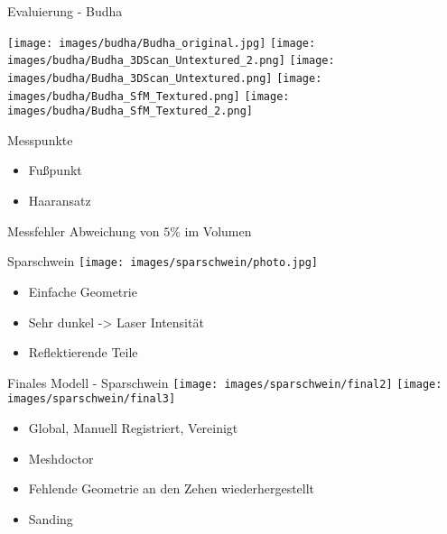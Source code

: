 \documentclass[11pt]{beamer}
\begin{document}
\begin{frame}{Evaluierung - Budha}

	\texttt{[image: images/budha/Budha\_original.jpg]}
	\texttt{[image: images/budha/Budha\_3DScan\_Untextured\_2.png]}
	\texttt{[image: images/budha/Budha\_3DScan\_Untextured.png]}
	\texttt{[image: images/budha/Budha\_SfM\_Textured.png]}
	\texttt{[image: images/budha/Budha\_SfM\_Textured\_2.png]}
	
	\begin{block}{Messpunkte}
		\begin{itemize}
			\item Fußpunkt
			\item Haaransatz
		\end{itemize}
	\end{block}
	\begin{block}{Messfehler}
		Abweichung von $5 \%$ im Volumen
	\end{block}
\end{frame}


\begin{frame}{Sparschwein}
\center
	\texttt{[image: images/sparschwein/photo.jpg]}
	\begin{block}{}
		\begin{itemize}
			\item Einfache Geometrie
			\item Sehr dunkel -> Laser Intensität
			\item Reflektierende Teile
		\end{itemize}
	\end{block}

\end{frame}

\begin{frame}{Finales Modell - Sparschwein}
\center
	\texttt{[image: images/sparschwein/final2]}
	\texttt{[image: images/sparschwein/final3]}
	\begin{block}{}
		\begin{itemize}
			\item Global, Manuell Registriert, Vereinigt
			\item Meshdoctor
			\item Fehlende Geometrie an den Zehen wiederhergestellt
			\item Sanding
		\end{itemize}
	\end{block}
\end{frame}
\end{document}
